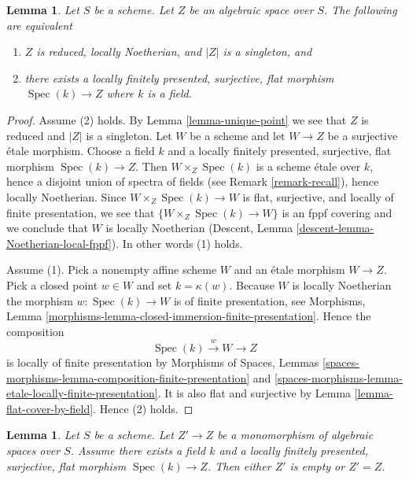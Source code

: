 \documentclass{stacks-project}
\theoremstyle{plain}
\newtheorem{lemma}[subsection]{Lemma}
\theoremstyle{definition}
\theoremstyle{remark}
\numberwithin{equation}{subsection}
\def\Spec{\mathop{\mathrm{Spec}}}
\begin{document}
\begin{lemma}
\label{lemma-unique-point-better}
Let $S$ be a scheme. Let $Z$ be an algebraic space over $S$.
The following are equivalent
\begin{enumerate}
\item $Z$ is reduced, locally Noetherian, and $|Z|$
is a singleton, and
\item there exists a locally finitely presented, surjective, flat morphism
$\Spec(k) \to Z$ where $k$ is a field.
\end{enumerate}
\end{lemma}

\begin{proof}
Assume (2) holds. By
Lemma \ref{lemma-unique-point}
we see that $Z$ is reduced and $|Z|$ is a singleton.
Let $W$ be a scheme and let $W \to Z$ be a surjective \'etale
morphism. Choose a field $k$ and a locally finitely presented, surjective,
flat morphism $\Spec(k) \to Z$.
Then $W \times_Z \Spec(k)$ is a scheme
\'etale over $k$, hence a disjoint union of spectra of fields
(see Remark \ref{remark-recall}),
hence locally Noetherian. Since $W \times_Z \Spec(k) \to W$
is flat, surjective, and locally of finite presentation, we see
that $\{W \times_Z \Spec(k) \to W\}$ is an fppf covering
and we conclude that $W$ is locally Noetherian
(Descent, Lemma
\ref{descent-lemma-Noetherian-local-fppf}).
In other words (1) holds.

\medskip\noindent
Assume (1). Pick a nonempty affine scheme $W$ and an \'etale morphism
$W \to Z$. Pick a closed point $w \in W$ and set
$k = \kappa(w)$. Because $W$ is locally Noetherian the morphism
$w : \Spec(k) \to W$ is of finite presentation, see
Morphisms, Lemma \ref{morphisms-lemma-closed-immersion-finite-presentation}.
Hence the composition
$$
\Spec(k) \xrightarrow{w} W \longrightarrow Z
$$
is locally of finite presentation by
Morphisms of Spaces, Lemmas
\ref{spaces-morphisms-lemma-composition-finite-presentation} and
\ref{spaces-morphisms-lemma-etale-locally-finite-presentation}.
It is also flat and surjective by
Lemma \ref{lemma-flat-cover-by-field}.
Hence (2) holds.
\end{proof}

\begin{lemma}
\label{lemma-monomorphism-into-point}
Let $S$ be a scheme.
Let $Z' \to Z$ be a monomorphism of algebraic spaces over $S$.
Assume there exists a field $k$ and a locally finitely presented, surjective,
flat morphism $\Spec(k) \to Z$. Then either $Z'$
is empty or $Z' = Z$.
\end{lemma}
\end{document}
